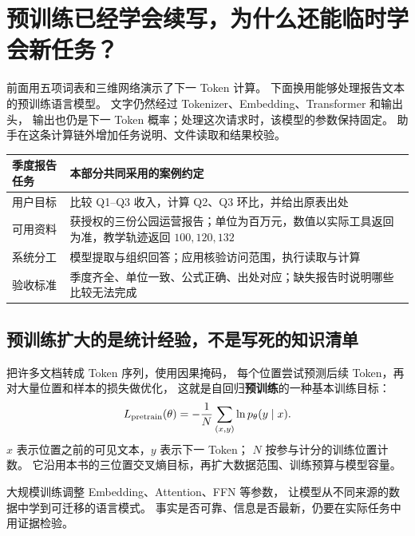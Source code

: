 \chapterrule
\section{预训练已经学会续写，为什么还能临时学会新任务？}
\label{intro:pretraining-icl}

\label{concept:pretraining}
\label{concept:in-context-learning}


前面用五项词表和三维网络演示了下一 Token 计算。
下面换用能够处理报告文本的预训练语言模型。
文字仍然经过 Tokenizer、Embedding、Transformer 和输出头，
输出也仍是下一 Token 概率；处理这次请求时，该模型的参数保持固定。
助手在这条计算链外增加任务说明、文件读取和结果校验。



\begin{center}\small
{}
\begin{tabularx}{\linewidth}{@{}p{22mm}X@{}}\toprule
季度报告任务 & 本部分共同采用的案例约定\\\midrule
用户目标 & 比较 Q1--Q3 收入，计算 Q2、Q3 环比，并给出原表出处\\
可用资料 & 获授权的三份公园运营报告；单位为百万元，数值以实际工具返回为准，教学轨迹返回 $100,120,132$\\
系统分工 & 模型提取与组织回答；应用核验访问范围，执行读取与计算\\
验收标准 & 季度齐全、单位一致、公式正确、出处对应；缺失报告时说明哪些比较无法完成\\\bottomrule
\end{tabularx}
\end{center}

\subsection{预训练扩大的是统计经验，不是写死的知识清单}

把许多文档转成 Token 序列，使用因果掩码，
每个位置尝试预测后续 Token，再对大量位置和样本的损失做优化，
这就是自回归\textbf{预训练}的一种基本训练目标：
\[
L_{\rm pretrain}(\theta)=
-\frac1N\sum_{(x,y)}\ln p_\theta(y\mid x).
\]
$x$ 表示位置之前的可见文本，$y$ 表示下一 Token；
$N$ 按参与计分的训练位置计数。
它沿用本书的三位置交叉熵目标，再扩大数据范围、训练预算与模型容量。

大规模训练调整 Embedding、Attention、FFN 等参数，
让模型从不同来源的数据中学到可迁移的语言模式。
事实是否可靠、信息是否最新，仍要在实际任务中用证据检验。

